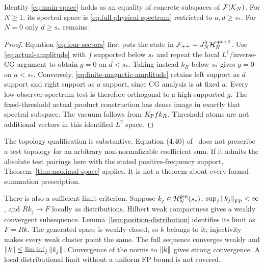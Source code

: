 \begin{theorem}
Identity \eqref{eq:main-space} holds as an equality of concrete subspaces
of $\mathcal F(\mathcal K_N)$. For $N\ge1$, its spectral space is
\eqref{eq:full-physical-spectrum} restricted to $a,d\ge s_*$. For $N=0$
only $d\ge s_*$ remains.
\label{thm:maximal-space}
\end{theorem}
\begin{proof}
Equation \eqref{eq:four-sectors} first puts the state in
$\mathcal F_{++}=J_N^0\mathcal H_N^{\mathrm{spec},0}$. Use \eqref{eq:actual-amplitude} with
$f$ supported below $s_*$ and repeat the local $L^1$/inverse-CG argument
to obtain $g=0$ on $d<s_*$. Taking instead $k_R$ below $s_*$ gives
$g=0$ on $a<s_*$. Conversely, \eqref{eq:finite-magnetic-amplitude}
retains left support as $d$ support and right support as $a$ support,
since CG analysis is at fixed $a$. Every low-observer-spectrum test is
therefore orthogonal to a high-supported $g$. The fixed-threshold actual
product construction has dense image in exactly that spectral subspace.
The vacuum follows from $K_{\mathrm P} f k_R$. Threshold atoms are not additional
vectors in this identified $L^2$ space.
\end{proof}

The topology qualification is substantive. Equation (4.40) of~\cite{KL}
does not prescribe a test topology for an arbitrary non-normalizable
coefficient sum. If it admits the absolute test pairings here with the
stated positive-frequency support, Theorem~\ref{thm:maximal-space}
applies. It is not a theorem about every formal summation prescription.

There is also a sufficient limit criterion. Suppose
$k_j\in\mathcal H_N^{\mathrm{gen}}(s_*)$, $\sup_j\left\lVert k_j\right\rVert_{\mathrm{FP}}<\infty$, and
$Rk_j\to F$ locally as distributions. Hilbert weak compactness gives a
weakly convergent subsequence. Lemma~\ref{lem:position-distribution}
identifies its limit as $F=Rk$. The generated space is weakly closed,
so $k$ belongs to it; injectivity makes every weak cluster point the same.
The full sequence converges weakly and
$\left\lVert k\right\rVert\le\liminf_j\left\lVert k_j\right\rVert$. Convergence of the norms to $\left\lVert k\right\rVert$
gives strong convergence. A local distributional limit without a uniform
FP bound is not covered.
